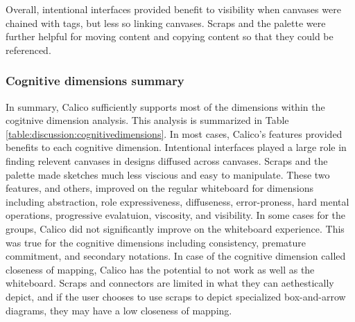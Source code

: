 Overall, intentional interfaces provided benefit to visibility when canvases were chained with tags, but less so linking canvases. Scraps and the palette were further helpful for moving content and copying content so that they could be referenced.

\subsubsection{Cognitive dimensions summary}

In summary, Calico sufficiently supports most of the dimensions within the cogitnive dimension analysis. This analysis is summarized in Table \ref{table:discussion:cognitivedimensions}. In most cases, Calico's features provided benefits to each cognitive dimension. Intentional interfaces played a large role in finding relevent canvases in designs diffused across canvases. Scraps and the palette made sketches much less viscious and easy to manipulate. These two features, and others, improved on the regular whiteboard for dimensions including abstraction, role expressiveness, diffuseness, error-proness, hard mental operations, progressive evalatuion, viscosity, and visibility. In some cases for the groups, Calico did not significantly improve on the whiteboard experience. This was true for the cognitive dimensions including consistency, premature commitment, and secondary notations. In case of the cognitive dimension called closeness of mapping, Calico has the potential to not work as well as the whiteboard. Scraps and connectors are limited in what they can aethestically depict, and if the user chooses to use scraps to depict specialized box-and-arrow diagrams, they may have a low closeness of mapping.




